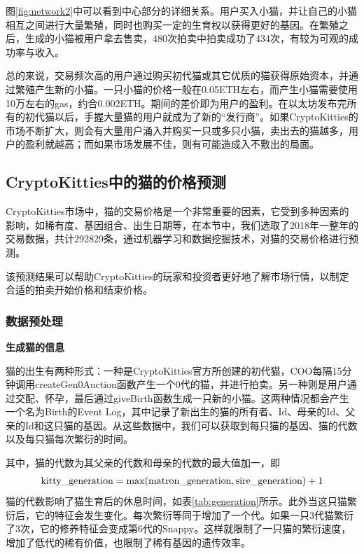 \documentclass{myreport}
\begin{document}
图\ref{fig:network2}中可以看到中心部分的详细关系。用户买入小猫，并让自己的小猫相互之间进行大量繁殖，同时也购买一定的生育权以获得更好的基因。在繁殖之后，生成的小猫被用户拿去售卖，480次拍卖中拍卖成功了434次，有较为可观的成功率与收入。

总的来说，交易频次高的用户通过购买初代猫或其它优质的猫获得原始资本，并通过繁殖产生新的小猫。一只小猫的价格一般在0.05ETH左右，而产生小猫需要使用10万左右的gas，约合0.002ETH。期间的差价即为用户的盈利。在以太坊发布完所有的初代猫以后，手握大量猫的用户就成为了新的“发行商”。如果CryptoKitties的市场不断扩大，则会有大量用户涌入并购买一只或多只小猫，卖出去的猫越多，用户的盈利就越高；而如果市场发展不佳，则有可能造成入不敷出的局面。





\subsection{CryptoKitties中的猫的价格预测}

CryptoKitties市场中，猫的交易价格是一个非常重要的因素，它受到多种因素的影响，如稀有度、基因组合、出生日期等，在本节中，我们选取了2018年一整年的交易数据，共计292829条，通过机器学习和数据挖掘技术，对猫的交易价格进行预测。

该预测结果可以帮助CryptoKitties的玩家和投资者更好地了解市场行情，以制定合适的拍卖开始价格和结束价格。


\subsubsection{数据预处理}

\noindent \textbf{生成猫的信息}


猫的出生有两种形式：一种是CryptoKitties官方所创建的初代猫，COO每隔15分钟调用createGen0Auction函数产生一个0代的猫，并进行拍卖。另一种则是用户通过交配、怀孕，最后通过giveBirth函数生成一只新的小猫。这两种情况都会产生一个名为Birth的Event Log，其中记录了新出生的猫的所有者、Id、母亲的Id、父亲的Id和这只猫的基因。从这些数据中，我们可以获取到每只猫的基因、猫的代数以及每只猫每次繁衍的时间。

其中，猫的代数为其父亲的代数和母亲的代数的最大值加一，即
\begin{align*}
{\rm kitty\_generation} = \max({\rm matron\_generation},{\rm sire\_generation})+1
\end{align*}
猫的代数影响了猫生育后的休息时间，如表\ref{tab:generation}所示。此外当这只猫繁衍后，它的特征会发生变化。每次繁衍等同于增加了一个代。如果一只3代猫繁衍了3次，它的修养特征会变成第6代的Snappy。这样就限制了一只猫的繁衍速度，增加了低代的稀有价值，也限制了稀有基因的遗传效率。
\end{document}
